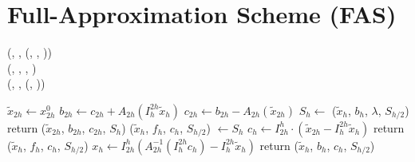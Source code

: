 \section{Full-Approximation Scheme (FAS)}
\begin{bnf}
\setcounter{equation}{6}
 {
	(\bnfts{$\omega$}, \bnfsp \bnfes, \bnfsp {}(, , \bnfsp {}))
 }
 \\
\setcounter{equation}{8}
 {
    (, \bnfsp {}, \bnfsp {}, )
	}
 \\
 \setcounter{equation}{11}
 {
	(, \bnfsp {}, \bnfsp {}(, \bnfsp {}))
}
\end{bnf}
\begin{table}[!htb]
	\begin{algorithmic}
	\State $\tilde{x}_{2h} \gets x_{2h}^0$ 
	\State $b_{2h} \gets c_{2h} + A_{2h} \left( I_{h}^{2h} \tilde{x}_h \right) $
	\State $c_{2h} \gets b_{2h} - A_{2h} \left( \tilde{x}_{2h} \right)$ 
	\State $S_h \gets$ ($\tilde{x}_{h}$, $b_{h}$, $\lambda$, $S_{h/2}$)
	\State return ($\tilde{x}_{2h}$, $b_{2h}$, $c_{2h}$, $S_h$)
	\EndFunction
	\State
	\State ($\tilde{x}_h$, $f_{h}$, $c_h$, $S_{h/2}$) $\gets S_{h}$
	\State $c_h \gets I_{2h}^{h} \cdot (\tilde{x}_{2h} - I_{h}^{2h} \tilde{x}_h)$
	\State return ($\tilde{x}_h$, $f_{h}$, $c_h$, $S_{h/2}$)
	\EndFunction
    \State
	\State $x_{h} \gets I_{2h}^{h} \left( A_{2h}^{-1}\left( I_{h}^{2h} c_h \right) - I_{h}^{2h} \tilde{x}_h \right)$ 
	\State return ($\tilde{x}_{h}$, $b_{h}$, $c_{h}$, $S_{h/2}$)
	\EndFunction
	\end{algorithmic}
\end{table}